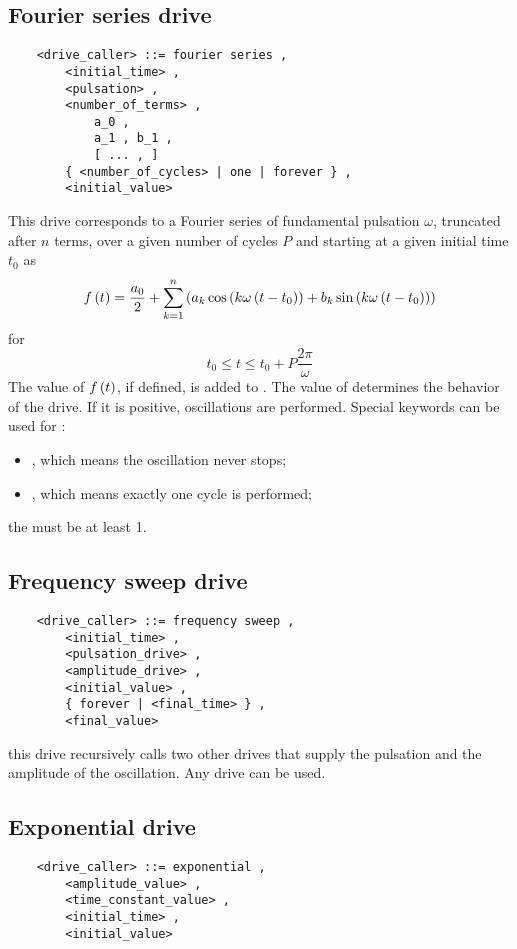 \subsection{Fourier series drive}
\begin{verbatim}
    <drive_caller> ::= fourier series ,
        <initial_time> ,
        <pulsation> ,
        <number_of_terms> ,
            a_0 ,
            a_1 , b_1 ,
            [ ... , ]
        { <number_of_cycles> | one | forever } , 
        <initial_value>
\end{verbatim}
This drive corresponds to a Fourier series of fundamental pulsation $\omega$,
truncated after $n$ terms, over a given number of cycles $P$ and starting 
at a given initial time $t_0$ as
\begin{displaymath}
	f\left( t \right) = \frac{a_0}{2} + \sum_{k=1}^n \left( 
		a_k \cos\left( k\omega\left( t - t_0 \right) \right)
		+ b_k \sin\left( k\omega\left( t - t_0 \right) \right)
	 \right)
\end{displaymath}
for
\begin{displaymath}
	t_0 \le t \le t_0 + P \frac{2 \pi}{\omega}
\end{displaymath}
The value of $f\left( t \right)$, if defined, is added to .
The value of  determines the behavior of the
drive. 
If it is positive,  oscillations are
performed.
Special keywords can be used for :
\begin{itemize}
	\item {}, which means the oscillation never stops;
	\item {}, which means exactly one cycle is performed;
\end{itemize}
the  must be at least 1.

\subsection{Frequency sweep drive}
\begin{verbatim}
    <drive_caller> ::= frequency sweep ,
        <initial_time> ,
        <pulsation_drive> ,
        <amplitude_drive> ,
        <initial_value> ,
        { forever | <final_time> } ,
        <final_value>
\end{verbatim}
this drive recursively calls two other drives that supply the pulsation 
and the amplitude of the oscillation. Any drive can be used.

\subsection{Exponential drive}
\begin{verbatim}
    <drive_caller> ::= exponential ,
        <amplitude_value> ,
        <time_constant_value> ,
        <initial_time> ,
        <initial_value>
\end{verbatim}

